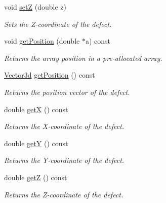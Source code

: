 \begin{DoxyCompactItemize}
void \hyperlink{classDefect_abb0b16c44a1b04d782f5c5f598b49d5b}{set\-Z} (double z)
\begin{DoxyCompactList}\small\item\em Sets the Z-\/coordinate of the defect. \end{DoxyCompactList}\item 
void \hyperlink{classDefect_a2bfcc6736a19eb9c4c8803ea0ea1e3f7}{get\-Position} (double $\ast$a) const 
\begin{DoxyCompactList}\small\item\em Returns the array position in a pre-\/allocated array. \end{DoxyCompactList}\item 
\hyperlink{classVector3d}{Vector3d} \hyperlink{classDefect_ad175c3f2b1fad6be48806dab69dfb32e}{get\-Position} () const 
\begin{DoxyCompactList}\small\item\em Returns the position vector of the defect. \end{DoxyCompactList}\item 
double \hyperlink{classDefect_a6e331ddeabd92e2edc124e6697d3bf7d}{get\-X} () const 
\begin{DoxyCompactList}\small\item\em Returns the X-\/coordinate of the defect. \end{DoxyCompactList}\item 
double \hyperlink{classDefect_ae307725c160984f44832fce5af896789}{get\-Y} () const 
\begin{DoxyCompactList}\small\item\em Returns the Y-\/coordinate of the defect. \end{DoxyCompactList}\item 
double \hyperlink{classDefect_a56e4a61e93d01dd765a921e3828af6c4}{get\-Z} () const 
\begin{DoxyCompactList}\small\item\em Returns the Z-\/coordinate of the defect. \end{DoxyCompactList}\end{DoxyCompactItemize}
